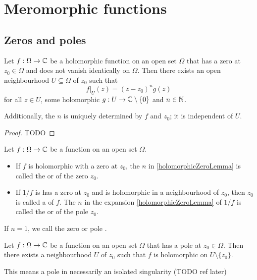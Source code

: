 \section{Meromorphic functions}
\subsection{Zeros and poles}
\begin{lemma} \label{holomorphicZeroLemma}
Let $f:\Omega\to \mathbb{C}$ be a holomorphic function on an open set $\Omega$ that has a zero at $z_0\in \Omega$ and does not vanish identically on $\Omega$. Then there exists an open neighbourhood $U\subseteq \Omega$ of $z_0$ such that
\[ f|_U(z) = (z-z_0)^ng(z) \]
for all $z\in U$, some holomorphic $g:U\to \mathbb{C}\setminus\{0\}$ and $n\in \mathbb{N}$.

Additionally, the $n$ is uniquely determined by $f$ and $z_0$; it is independent of $U$.
\end{lemma}
\begin{proof}
TODO
\end{proof}

\begin{definition}
Let $f:\Omega\to \mathbb{C}$ be a function on an open set $\Omega$.
\begin{itemize}
\item If $f$ is holomorphic with a zero at $z_0$, the $n$ in \ref{holomorphicZeroLemma} is called the  or  of the zero $z_0$.
\item If $1/f$ is has a zero at $z_0$ and is holomorphic in a neighbourhood of $z_0$, then $z_0$ is called a  of $f$. The $n$ in the expansion \ref{holomorphicZeroLemma} of $1/f$ is called the  or  of the pole $z_0$.
\end{itemize}
If $n = 1$, we call the zero or pole . 
\end{definition}

\begin{lemma}
Let $f:\Omega\to \mathbb{C}$ be a function on an open set $\Omega$ that has a pole at $z_0\in \Omega$. Then there exists a neighbourhood $U$ of $z_0$ such that $f$ is holomorphic on $U\setminus\{z_0\}$.
\end{lemma}
This means a pole in necessarily an isolated singularity (TODO ref later)

